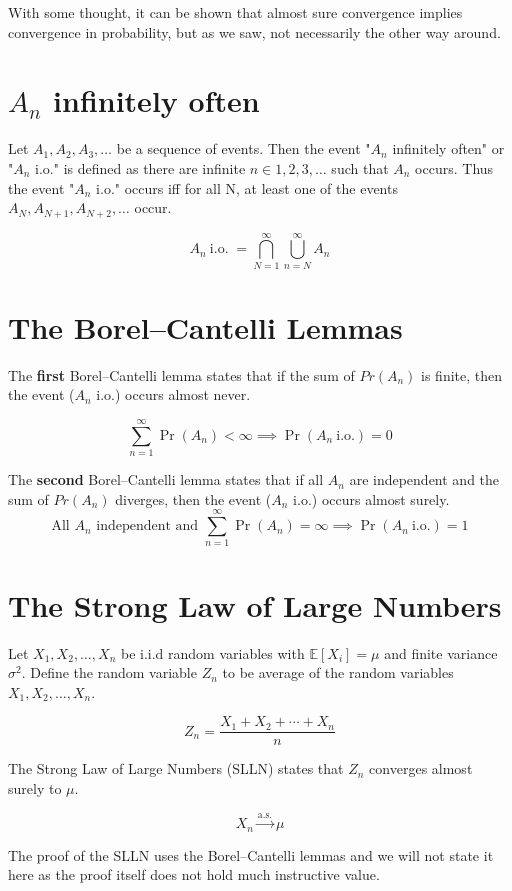 \noindent With some thought, it can be shown that almost sure convergence implies 
convergence in probability, but as we saw, not necessarily the other way around.

\section{$A_n$ infinitely often}
Let $A_1,A_2,A_3,\ldots$ be a sequence of events. Then the event "$A_n$ infinitely often" 
or "$A_n$ i.o." is defined as there are infinite $n \in {1,2,3,\ldots}$ such that $A_n$ occurs.
Thus the event "$A_n$ i.o." occurs iff for all N, at least one of the 
events $A_N, A_{N+1}, A_{N+2}, \ldots$ occur.

\[
A_n \ \mathrm{i.o.} \;
=
\bigcap_{N=1}^{\infty}
\bigcup_{n = N}^{\infty}A_n
\]


\section{The Borel--Cantelli Lemmas}

The \textbf{first} Borel--Cantelli lemma states that if the sum of $Pr(A_n)$ is finite, then the event 
($A_n$ i.o.) occurs almost never.

\[
\sum_{n=1}^{\infty}\Pr(A_n)<\infty
\implies
\Pr(A_n\ \mathrm{i.o.})=0
\]


\noindent The \textbf{second} Borel--Cantelli lemma states that if all $A_n$ are independent and 
the sum of $Pr(A_n)$ diverges, then the event ($A_n$ i.o.) occurs almost surely.
\[
\text{All $A_n$ independent and }
\sum_{n=1}^{\infty}\Pr(A_n)=\infty
\implies
\Pr(A_n\ \mathrm{i.o.})=1
\]

\section{The Strong Law of Large Numbers}

Let $X_1,X_2,\ldots,X_n$ be i.i.d random variables with $\mathbb E[X_i]=\mu$ and finite variance $\sigma^2$.
Define the random variable $Z_n$ to be average of the random variables $X_1,X_2,\ldots,X_n$.

\[
Z_n = \frac{X_1+X_2+\cdots+X_n}{n}
\]

\noindent The Strong Law of Large Numbers (SLLN) states that $Z_n$ converges almost surely to $\mu$.

\[
X_n\xrightarrow{\mathrm{a.s.}}\mu
\]

The proof of the SLLN uses the Borel--Cantelli lemmas and we 
will not state it here as the proof itself does not hold much instructive value. 

